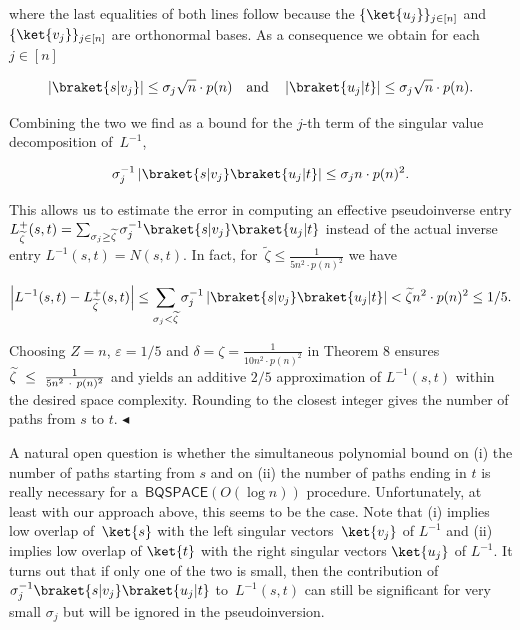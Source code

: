 \documentclass[10pt,a4paper]{article}
\begin{document}
where the last equalities of both lines follow because the $\{\ket{u_{j}}\}_{j\in[n]}$ and $\{\ket{v_{j}}\}_{j\in[n]}$ are orthonormal bases.
As a consequence we obtain for each $j\in[n]$\par


\[\begin{gathered}
\displaystyle\left|\braket{s|v_{j}}\right|\leq\sigma_{j}\sqrt{n}\cdot p(n)\quad\text{and}\quad\left|\braket{u_{j}|t}\right|\leq\sigma_{j}\sqrt{n}\cdot p(n).
\end{gathered}\]


Combining the two we find as a bound for the $j$-th term of the singular value decomposition of $L^{-1}$,\par


\[\begin{gathered}
\displaystyle\sigma_{j}^{-1}\left|\braket{s|v_{j}}\braket{u_{j}|t}\right|\leq\sigma_{j}n\cdot p(n)^{2}.
\end{gathered}\]


This allows us to estimate the error in computing an effective pseudoinverse entry $L_{\widetilde{\zeta}}^{+}(s,t)=\sum_{\sigma_{j}\geq\widetilde{\zeta}}\sigma_{j}^{-1}\braket{s|v_{j}}\braket{u_{j}|t}$ instead of the actual inverse entry $L^{-1}(s,t)=N(s,t)$.
In fact, for $\widetilde{\zeta}\leq\frac{1}{5n^{2}\cdot p(n)^{2}}$ we have\par


\[\begin{gathered}
\displaystyle\left|L^{-1}(s,t)-L_{\widetilde{\zeta}}^{+}(s,t)\right|\leq\sum_{\sigma_{j}<\widetilde{\zeta}}\sigma_{j}^{-1}\left|\braket{s|v_{j}}\braket{u_{j}|t}\right|<\widetilde{\zeta}n^{2}\cdot p(n)^{2}\leq 1/5.
\end{gathered}\]


Choosing $Z=n$, $\varepsilon=1/5$ and $\delta=\zeta=\frac{1}{10n^{2}\cdot p(n)^{2}}$ in Theorem 8 ensures $\widetilde{\zeta}\nobreak\ \leq\nobreak\ \frac{1}{5n^{2}\nobreak\ \cdot\nobreak\ p(n)^{2}}$ and yields an additive $2/5$ approximation of $L^{-1}(s,t)$ within the desired space complexity.
Rounding to the closest integer gives the number of paths from $s$ to $t$.
$\blacktriangleleft$\par




A natural open question is whether the simultaneous polynomial bound on (i) the number of paths starting from $s$ and on (ii) the number of paths ending in $t$ is really necessary for a $\mathsf{BQSPACE}(O(\log n))$ procedure.
Unfortunately, at least with our approach above, this seems to be the case.
Note that (i) implies low overlap of $\ket{s}$ with the left singular vectors $\ket{v_{j}}$ of $L^{-1}$ and (ii) implies low overlap of $\ket{t}$ with the right singular vectors $\ket{u_{j}}$ of $L^{-1}$.
It turns out that if only one of the two is small, then the contribution of $\sigma_{j}^{-1}\braket{s|v_{j}}\braket{u_{j}|t}$ to $L^{-1}(s,t)$ can still be significant for very small $\sigma_{j}$ but will be ignored in the pseudoinversion.\par
\end{document}
